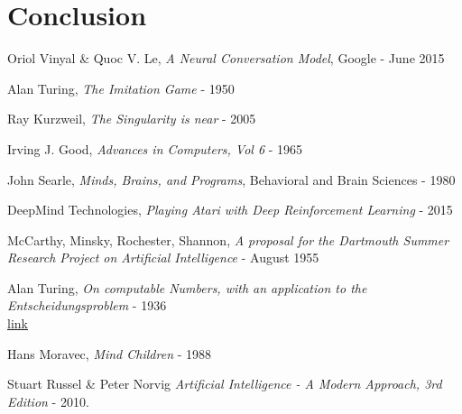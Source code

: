 \documentclass[12pt]{article}
\begin{document}

\section*{Conclusion}\label{conclusion}

\pagebreak

\printglossaries

\pagebreak

\begin{thebibliography}{40}

   Oriol Vinyal \& Quoc V. Le,
  {\em A Neural Conversation Model}, Google - June 2015

   Alan Turing, {\em The Imitation Game} - 1950

   Ray Kurzweil, {\em The Singularity is near} - 2005

   Irving J. Good, {\em Advances in Computers, Vol 6} - 1965

   John Searle, {\em Minds, Brains, and Programs},
  Behavioral and Brain Sciences - 1980

   DeepMind Technologies, {\em Playing Atari with Deep
  Reinforcement Learning} - 2015

   McCarthy, Minsky, Rochester, Shannon, {\em
  A proposal for the Dartmouth Summer Research Project on Artificial
  Intelligence} - August 1955

   Alan Turing, {\em On computable Numbers, with an
  application to the Entscheidungsproblem} - 1936 \\
  \href{http://www.cs.virginia.edu/~robins/Turing_Paper_1936.pdf}{link}

   Hans Moravec, {\em Mind Children} - 1988

   Stuart Russel \& Peter Norvig
  {\em Artificial Intelligence - A Modern Approach, 3rd Edition} - 2010.



\end{thebibliography}
\end{document}
